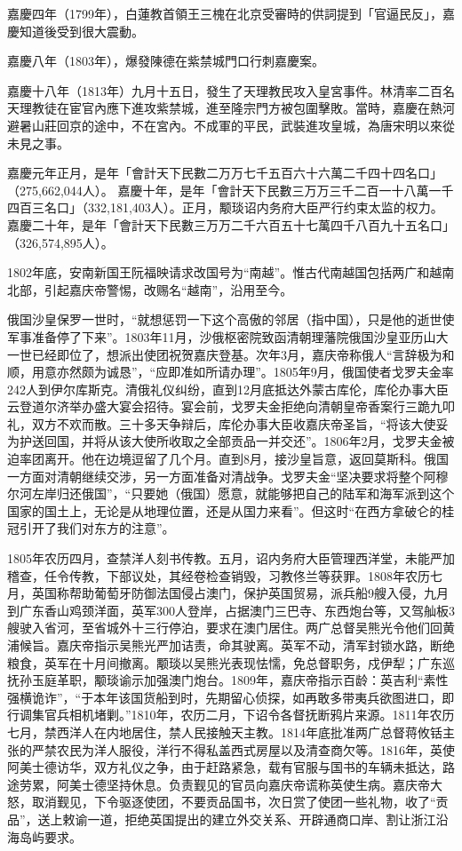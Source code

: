 嘉慶四年（1799年），白蓮教首領王三槐在北京受審時的供詞提到「官逼民反」，嘉慶知道後受到很大震動。

嘉慶八年（1803年），爆發陳德在紫禁城門口行刺嘉慶案。

嘉慶十八年（1813年）九月十五日，發生了天理教民攻入皇宮事件。林清率二百名天理教徒在宦官內應下進攻紫禁城，進至隆宗門方被包圍擊敗。當時，嘉慶在熱河避暑山莊回京的途中，不在宮內。不成軍的平民，武裝進攻皇城，為唐宋明以來從未見之事。

嘉慶元年正月，是年「會計天下民數二万万七千五百六十六萬二千四十四名口」（275,662,044人）。
嘉慶十年，是年「會計天下民數三万万三千二百一十八萬一千四百三名口」（332,181,403人）。正月，颙琰诏内务府大臣严行约束太监的权力。嘉慶二十年，是年「會計天下民數三万万二千六百五十七萬四千八百九十五名口」（326,574,895人）。

1802年底，安南新国王阮福映请求改国号为“南越”。惟古代南越国包括两广和越南北部，引起嘉庆帝警惕，改赐名“越南”，沿用至今。

俄国沙皇保罗一世时，“就想惩罚一下这个高傲的邻居（指中国），只是他的逝世使军事准备停了下来”。1803年11月，沙俄枢密院致函清朝理藩院俄国沙皇亚历山大一世已经即位了，想派出使团祝贺嘉庆登基。次年3月，嘉庆帝称俄人“言辞极为和顺，用意亦然颇为诚恳”，“应即准如所请办理”。1805年9月，俄国使者戈罗夫金率242人到伊尔库斯克。清俄礼仪纠纷，直到12月底抵达外蒙古库伦，库伦办事大臣云登道尔济举办盛大宴会招待。宴会前，戈罗夫金拒绝向清朝皇帝香案行三跪九叩礼，双方不欢而散。三十多天争辩后，库伦办事大臣收嘉庆帝圣旨，“将该大使妥为护送回国，并将从该大使所收取之全部贡品一并交还”。1806年2月，戈罗夫金被迫率团离开。他在边境逗留了几个月。直到8月，接沙皇旨意，返回莫斯科。俄国一方面对清朝继续交涉，另一方面准备对清战争。戈罗夫金“坚决要求将整个阿穆尔河左岸归还俄国”，“只要她（俄国）愿意，就能够把自己的陆军和海军派到这个国家的国土上，无论是从地理位置，还是从国力来看”。但这时“在西方拿破仑的桂冠引开了我们对东方的注意”。

1805年农历四月，查禁洋人刻书传教。五月，诏内务府大臣管理西洋堂，未能严加稽查，任令传教，下部议处，其经卷检查销毁，习教佟兰等获罪。1808年农历七月，英国称帮助葡萄牙防御法国侵占澳门，保护英国贸易，派兵船9艘入侵，九月到广东香山鸡颈洋面，英军300人登岸，占据澳门三巴寺、东西炮台等，又驾舢板3艘驶入省河，至省城外十三行停泊，要求在澳门居住。两广总督吴熊光令他们回黄浦候旨。嘉庆帝指示吴熊光严加诘责，命其驶离。英军不动，清军封锁水路，断绝粮食，英军在十月间撤离。颙琰以吴熊光表现怯懦，免总督职务，戍伊犁；广东巡抚孙玉庭革职，颙琰谕示加强澳门炮台。1809年，嘉庆帝指示百龄：英吉利“素性强横诡诈”，“于本年该国货船到时，先期留心侦探，如再敢多带夷兵欲图进口，即行调集官兵相机堵剿。”1810年，农历二月，下诏令各督抚断鸦片来源。1811年农历七月，禁西洋人在内地居住，禁人民接触天主教。1814年底批准两广总督蒋攸铦主张的严禁农民为洋人服役，洋行不得私盖西式房屋以及清查商欠等。1816年，英使阿美士德访华，双方礼仪之争，由于赶路紧急，载有官服与国书的车辆未抵达，路途劳累，阿美士德坚持休息。负责觐见的官员向嘉庆帝谎称英使生病。嘉庆帝大怒，取消觐见，下令驱逐使团，不要贡品国书，次日赏了使团一些礼物，收了“贡品”，送上敕谕一道，拒绝英国提出的建立外交关系、开辟通商口岸、割让浙江沿海岛屿要求。

